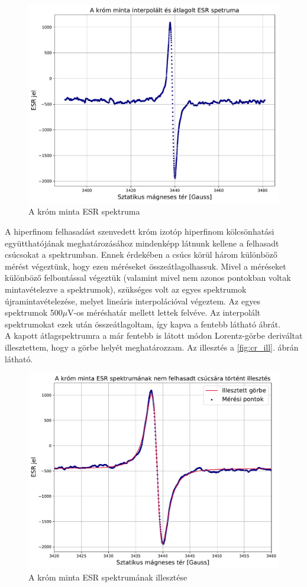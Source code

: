 \documentclass[12pt,a4paper]{article}
\begin{document}
\begin{figure}[!h]
\centering
\includegraphics[scale=0.6]{crom_avg_spec}
\caption{A króm minta ESR spektruma}
\label{fig:cr}
\end{figure}
\newline
A hiperfinom felhasadást szenvedett króm izotóp hiperfinom kölcsönhatási együtthatójának meghatározásához mindenképp látnunk kellene a felhasadt csúcsokat a spektrumban. Ennek érdekében a csúcs körül három különböző mérést végeztünk, hogy ezen méréseket összeátlagolhassuk. Mivel a méréseket különböző felbontással végeztük (valamint mivel nem azonos pontokban voltak mintavételezve a spektrumok), szükséges volt az egyes spektrumok újramintavételezése, melyet lineáris interpolációval végeztem. Az egyes spektrumok 500$\mu$V-os méréshatár mellett lettek felvéve. Az interpolált spektrumokat ezek után összeátlagoltam, így kapva a fentebb látható ábrát.\\
\hspace*{10pt} A kapott átlagspektrumra a már fentebb is látott módon Lorentz-görbe deriváltat illesztettem, hogy a görbe helyét meghatározzam. Az illesztés a \ref{fig:cr_ill}. ábrán látható.
\begin{figure}[!h]
\centering
\includegraphics[scale=0.6]{cr_peak_fit}
\caption{A króm minta ESR spektrumának illesztése}
\label{fig:cr}
\end{figure}
\end{document}
